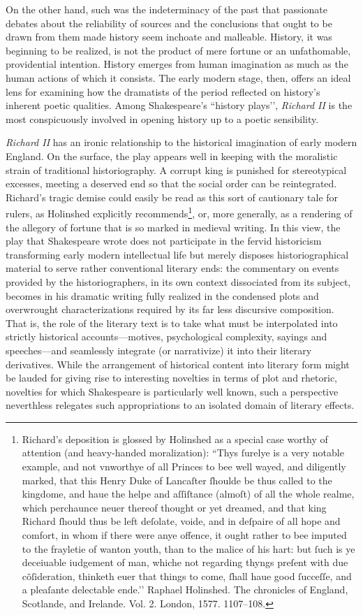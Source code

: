 On the other hand, such was the indeterminacy of the past that passionate debates about the reliability of sources and the conclusions that ought to be drawn from them made history seem inchoate and malleable.
History, it was beginning to be realized, is not the product of mere fortune or an unfathomable, providential intention.
History emerges from human imagination as much as the human actions of which it consists.
The early modern stage, then, offers an ideal lens for examining how the dramatists of the period reflected on history’s inherent poetic qualities.
Among Shakespeare’s ``history plays’’, \emph{Richard II} is the most conspicuously involved in opening history up to a poetic sensibility.

\emph{Richard II} has an ironic relationship to the historical imagination of early modern England.
On the surface, the play appears well in keeping with the moralistic strain of traditional historiography.
A corrupt king is punished for stereotypical excesses, meeting a deserved end so that the social order can be reintegrated.
Richard’s tragic demise could easily be read as this sort of cautionary tale for rulers, as Holinshed explicitly recommends\footnote{Richard's deposition is glossed by Holinshed as a special case worthy of attention (and heavy-handed moralization): ``Thys ſurelye is a very notable example, and not vnworthye of all Princes to bee well wayed, and diligently marked, that this Henry Duke of Lancaſter ſhoulde be thus called to the kingdome, and haue the helpe and aſſiſtance (almoſt) of all the whole realme, which perchaunce neuer thereof thought or yet dreamed, and that king Richard ſhould thus be left deſolate, voide, and in deſpaire of all hope and comfort, in whom if there were anye offence, it ought rather to bee imputed to the frayletie of wanton youth, than to the malice of his hart: but ſuch is ye deceiuable iudgement of man, whiche not regarding thyngs preſent with due cõſideration, thinketh euer that things to come, ſhall haue good ſucceſſe, and a pleaſante delectable ende.’’ Raphael Holinshed. The chronicles of England, Scotlande, and Irelande. Vol. 2. London, 1577. 1107--108.}, or, more generally, as a rendering of the allegory of fortune that is so marked in medieval writing.
In this view, the play that Shakespeare wrote does not participate in the fervid historicism transforming early modern intellectual life but merely disposes historiographical material to serve rather conventional literary ends: the commentary on events provided by the historiographers, in its own context dissociated from its subject, becomes in his dramatic writing fully realized in the condensed plots and overwrought characterizations required by its far less discursive composition.
That is, the role of the literary text is to take what must be interpolated into strictly historical accounts---motives, psychological complexity, sayings and speeches---and seamlessly integrate (or narrativize) it into their literary derivatives.
While the arrangement of historical content into literary form might be lauded for giving rise to interesting novelties in terms of plot and rhetoric, novelties for which Shakespeare is particularly well known, such a perspective neverthless relegates such appropriations to an isolated domain of literary effects.

